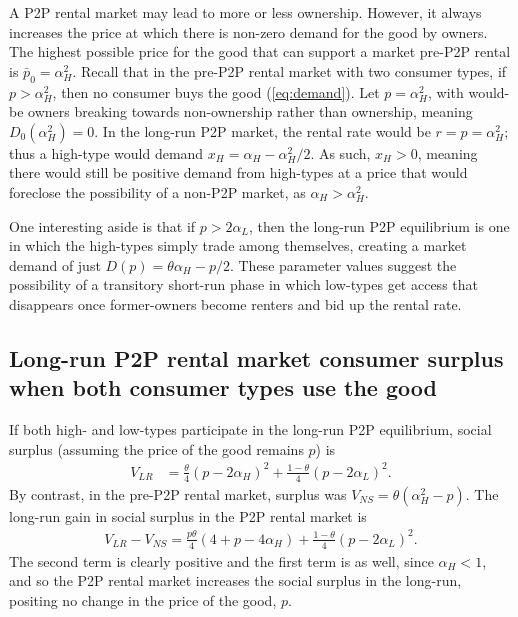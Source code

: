 \documentclass[11pt]{article}
\begin{document}
A P2P rental market may lead to more or less ownership.
However, it always increases the price at which there is non-zero demand for the good by owners. 
The highest possible price for the good that can support a market pre-P2P rental is $\bar{p}_0 = \alpha_H^2$.
Recall that in the pre-P2P rental market with two consumer types, if $p > \alpha_H^2$, then no consumer buys the good (\ref{eq:demand}).
Let $p = \alpha_H^2$, with would-be owners breaking towards non-ownership rather than ownership, meaning $D_0(\alpha_H^2) = 0$. 
In the long-run P2P market, the rental rate would be $r = p = \alpha_H^2$; thus a high-type would demand $x_H = \alpha_H - \alpha_H^2/2$.
As such, $x_H > 0$, meaning there would still be positive demand from high-types at a price that would foreclose the possibility of a non-P2P market, as  $\alpha_H > \alpha_H^2$.  

One interesting aside is that if $p > 2 \alpha_L$, then the long-run P2P equilibrium is one in which the high-types simply trade among themselves, creating a market demand of just $D(p) = \theta \alpha_H - p/2$. 
These parameter values suggest the possibility of a transitory short-run phase in which low-types get access that disappears once former-owners become renters and bid up the rental rate. 

\subsection{Long-run P2P rental market consumer surplus when both consumer types use the good} 
If both high- and low-types participate in the long-run P2P equilibrium, social surplus (assuming the price of the good remains $p$) is 
\begin{align} 
V_{LR} & = \frac{\theta}{4}(p - 2\alpha_H)^2 + \frac{1-\theta}{4}(p - 2\alpha_L)^2.
\end{align} 
By contrast, in the pre-P2P rental market, surplus was $V_{NS} = \theta(\alpha_H^2 - p)$.  
The long-run gain in social surplus in the P2P rental market is  
\begin{align}
V_{LR} - V_{NS} = \frac{p\theta}{4}(4 + p - 4 \alpha_H) + \frac{1-\theta}{4}(p - 2\alpha_L)^2. 
\end{align}
The second term is clearly positive and the first term is as well, since $\alpha_H < 1$, and so the P2P rental market increases the social surplus in the long-run, positing no change in the price of the good, $p$. 
\end{document}
